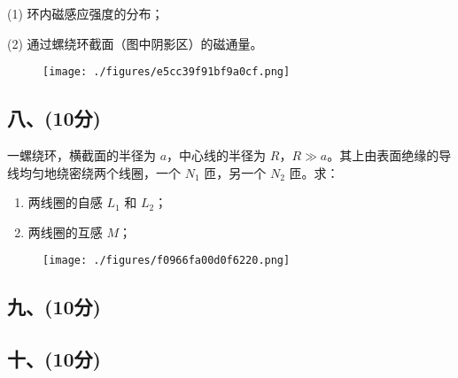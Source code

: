 (1) 环内磁感应强度的分布；

(2) 通过螺绕环截面（图中阴影区）的磁通量。
\begin{figure}[ht]
\centering
\texttt{[image: ./figures/e5cc39f91bf9a0cf.png]}
\caption{} \label{fig_NJU10_7}
\end{figure}
\subsection{八、(10分)}
一螺绕环，横截面的半径为 $a$，中心线的半径为 $R$，$R \gg a$。其上由表面绝缘的导线均匀地绕密绕两个线圈，一个 $N_1$ 匝，另一个 $N_2$ 匝。求：
\begin{enumerate}
    \item 两线圈的自感 $L_1$ 和 $L_2$；
    \item 两线圈的互感 $M$；
\end{enumerate}
\begin{figure}[ht]
\centering
\texttt{[image: ./figures/f0966fa00d0f6220.png]}
\caption{} \label{fig_NJU10_8}
\end{figure}
\subsection{九、(10分)}

\subsection{十、(10分)}